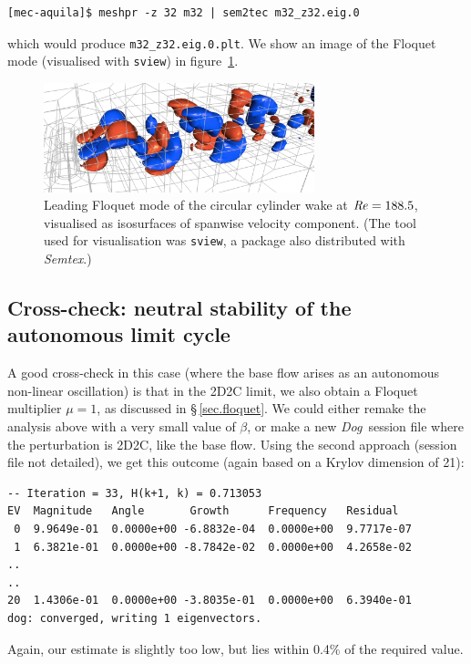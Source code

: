 \documentclass[11pt,a4paper]{report}
\newcommand\Rey{\mbox{\textit{Re}}}
\newcommand{\Semtex}{\emph{Semtex}}
\newcommand{\Dog}{\emph{Dog}}
\begin{document}
\begin{verbatim}
[mec-aquila]$ meshpr -z 32 m32 | sem2tec m32_z32.eig.0
\end{verbatim}
\noindent which would produce \verb+m32_z32.eig.0.plt+.  We show an
image of the Floquet mode (visualised with \texttt{sview}) in
figure~\ref{fig.flok}.

\begin{figure}
\begin{center}
\includegraphics[width=0.7\textwidth]{cyl_flok_mode}
\end{center}
\caption{Leading Floquet mode of the circular cylinder wake at
  $\Rey=188.5$, visualised as isosurfaces of spanwise velocity
  component. (The tool used for visualisation was \texttt{sview}, a
  package also distributed with \Semtex.)}
\label{fig.flok}
\end{figure}


\subsection{Cross-check: neutral stability of the autonomous limit cycle}

A good cross-check in this case (where the base flow arises as an
autonomous non-linear oscillation) is that in the 2D2C limit, we also
obtain a Floquet multiplier $\mu=1$, as discussed in
\S\,\ref{sec.floquet}.  We could either remake the analysis above with
a very small value of $\beta$, or make a new \Dog\ session file where
the perturbation is 2D2C, like the base flow.  Using the second
approach (session file not detailed), we get this outcome (again based
on a Krylov dimension of 21): {\small
\begin{verbatim}
-- Iteration = 33, H(k+1, k) = 0.713053
EV  Magnitude   Angle       Growth      Frequency   Residual
 0  9.9649e-01  0.0000e+00 -6.8832e-04  0.0000e+00  9.7717e-07
 1  6.3821e-01  0.0000e+00 -8.7842e-02  0.0000e+00  4.2658e-02
..
..
20  1.4306e-01  0.0000e+00 -3.8035e-01  0.0000e+00  6.3940e-01
dog: converged, writing 1 eigenvectors.
\end{verbatim}
}\noindent Again, our estimate is slightly too low, but lies within
0.4\% of the required value.
\end{document}
